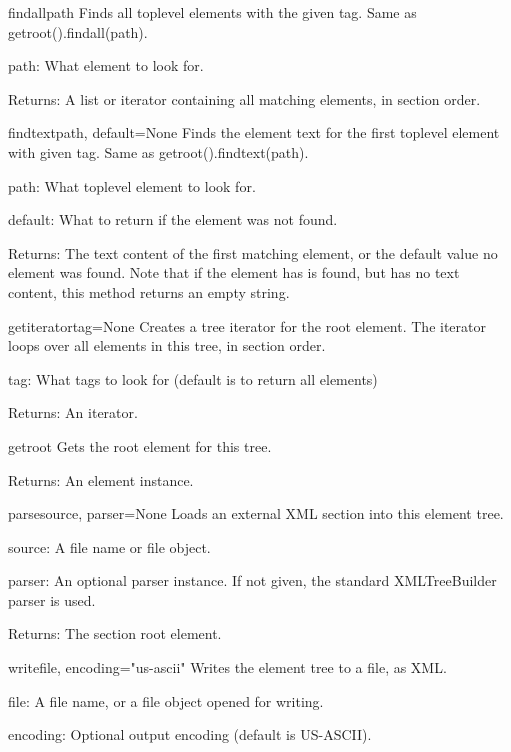 \begin{methoddesc}{findall}{path}
Finds all toplevel elements with the given tag.
Same as getroot().findall(path).

path: What element to look for.

Returns: A list or iterator containing all matching elements,
in section order.
\end{methoddesc}

\begin{methoddesc}{findtext}{path, default=None}
Finds the element text for the first toplevel element with given
tag.  Same as getroot().findtext(path).

path: What toplevel element to look for.

default: What to return if the element was not found.

Returns: The text content of the first matching element, or the
default value no element was found.  Note that if the element
has is found, but has no text content, this method returns an
empty string.
\end{methoddesc}

\begin{methoddesc}{getiterator}{tag=None}
Creates a tree iterator for the root element.  The iterator loops
over all elements in this tree, in section order.

tag: What tags to look for (default is to return all elements)

Returns: An iterator.
\end{methoddesc}

\begin{methoddesc}{getroot}{}
Gets the root element for this tree.

\begin{datadescni}{Returns:}
An element instance.
\end{datadescni}
\end{methoddesc}

\begin{methoddesc}{parse}{source, parser=None}
Loads an external XML section into this element tree.

source: A file name or file object.

parser: An optional parser instance.  If not given, the
standard XMLTreeBuilder parser is used.

Returns: The section root element.
\end{methoddesc}

\begin{methoddesc}{write}{file, encoding="us-ascii"}
Writes the element tree to a file, as XML.

file: A file name, or a file object opened for writing.

encoding: Optional output encoding (default is US-ASCII).
\end{methoddesc}


